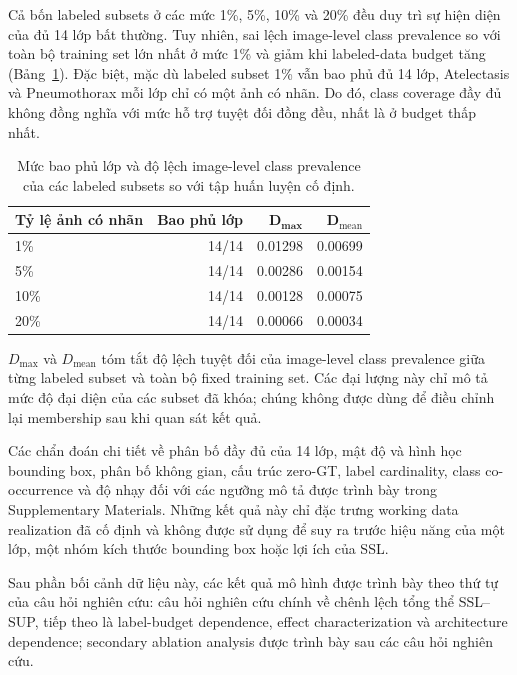 \documentclass[pdflatex,sn-mathphys-num]{sn-jnl}%
\theoremstyle{thmstyleone}%
\theoremstyle{thmstyletwo}%
\theoremstyle{thmstylethree}%
\begin{document}
Cả bốn labeled subsets ở các mức 1\%, 5\%, 10\% và 20\% đều duy trì sự hiện diện của đủ 14 lớp bất thường. Tuy nhiên, sai lệch image-level class prevalence so với toàn bộ training set lớn nhất ở mức 1\% và giảm khi labeled-data budget tăng (Bảng~\ref{tab:pretraining_subset_representativeness}). Đặc biệt, mặc dù labeled subset 1\% vẫn bao phủ đủ 14 lớp, Atelectasis và Pneumothorax mỗi lớp chỉ có một ảnh có nhãn. Do đó, class coverage đầy đủ không đồng nghĩa với mức hỗ trợ tuyệt đối đồng đều, nhất là ở budget thấp nhất.

\begin{table}[htbp]
\centering
\caption{Mức bao phủ lớp và độ lệch image-level class prevalence của các labeled subsets so với tập huấn luyện cố định.}
\label{tab:pretraining_subset_representativeness}
\small
\begin{tabular}{lrrr}
\toprule
\textbf{Tỷ lệ ảnh có nhãn} & \textbf{Bao phủ lớp} & \(\boldsymbol{D_{\max}}\) & \(\boldsymbol{D_{\mathrm{mean}}}\) \\
\midrule
1\%  & 14/14 & 0.01298 & 0.00699 \\
5\%  & 14/14 & 0.00286 & 0.00154 \\
10\% & 14/14 & 0.00128 & 0.00075 \\
20\% & 14/14 & 0.00066 & 0.00034 \\
\bottomrule
\end{tabular}
\end{table}

\(D_{\max}\) và \(D_{\mathrm{mean}}\) tóm tắt độ lệch tuyệt đối của image-level class prevalence giữa từng labeled subset và toàn bộ fixed training set. Các đại lượng này chỉ mô tả mức độ đại diện của các subset đã khóa; chúng không được dùng để điều chỉnh lại membership sau khi quan sát kết quả.

Các chẩn đoán chi tiết về phân bố đầy đủ của 14 lớp, mật độ và hình học bounding box, phân bố không gian, cấu trúc zero-GT, label cardinality, class co-occurrence và độ nhạy đối với các ngưỡng mô tả được trình bày trong Supplementary Materials. Những kết quả này chỉ đặc trưng working data realization đã cố định và không được sử dụng để suy ra trước hiệu năng của một lớp, một nhóm kích thước bounding box hoặc lợi ích của SSL.

Sau phần bối cảnh dữ liệu này, các kết quả mô hình được trình bày theo thứ tự của câu hỏi nghiên cứu: câu hỏi nghiên cứu chính về chênh lệch tổng thể SSL--SUP, tiếp theo là label-budget dependence, effect characterization và architecture dependence; secondary ablation analysis được trình bày sau các câu hỏi nghiên cứu.
\end{document}
